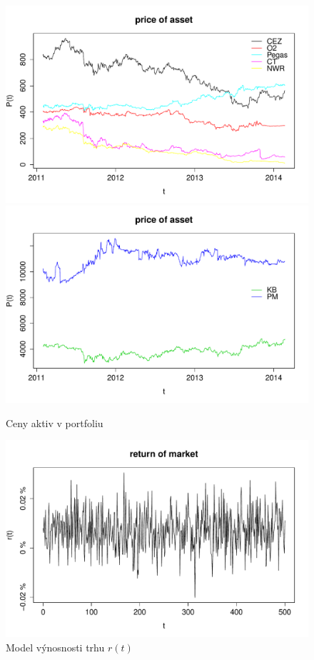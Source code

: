 \documentclass[a4paper,12pt]{report}
\theoremstyle{definition} \newtheorem{definice}[veta]{Definice}
\theoremstyle{remark}
\begin{document}
\begin{figure}[!htbp]
  \centering 
	\includegraphics[width=13.5cm, clip, trim= 0 15 25 50]{IMG/data_price_of_asset_ostatni.pdf}\\[5mm]
	\includegraphics[width=13.5cm, clip, trim= 0 15 25 50]{IMG/data_price_of_asset_KBPM_v2.pdf}	
  \caption{Ceny aktiv v portfoliu}  \label{model_price_of_asset}
\end{figure}

\begin{figure}[!htbp]
  \centering 
	\includegraphics[width=13.5cm, clip, trim= 0 15 25 50]{IMG/return_of_market_v4b.pdf}
  \caption{Model výnosnosti trhu $r(t)$}  \label{return_of_market}
\end{figure}
\end{document}
